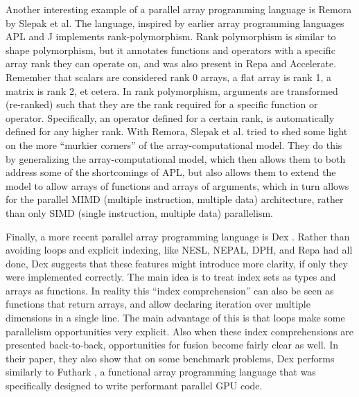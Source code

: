         Another interesting example of a parallel array programming language is Remora by Slepak et al. \cite{slepak2014array}
        The language, inspired by earlier array programming languages APL \cite{iverson1962programming} and J implements rank-polymorphism.
        Rank polymorphism is similar to shape polymorphism, but it annotates functions and operators with a specific array rank they can operate on, and was also present in Repa and Accelerate.
        Remember that scalars are considered rank 0 arrays, a flat array is rank 1, a matrix is rank 2, et cetera.
        In rank polymorphism, arguments are transformed (re-ranked) such that they are the rank required for a specific function or operator.
        Specifically, an operator defined for a certain rank, is automatically defined for any higher rank.
        With Remora, Slepak et al. tried to shed some light on the more ``murkier corners'' of the array-computational model.
        They do this by generalizing the array-computational model, which then allows them to both address some of the shortcomings of APL, but also allows them to extend the model to allow arrays of functions and arrays of arguments, which in turn allows for the parallel MIMD (multiple instruction, multiple data) architecture, rather than only SIMD (single instruction, multiple data) parallelism.

        Finally, a more recent parallel array programming language is Dex \cite{maclaurin2019dex,paszke2021getting}.
        Rather than avoiding loops and explicit indexing, like NESL, NEPAL, DPH, and Repa had all done, Dex suggests that these features might introduce more clarity, if only they were implemented correctly.
        The main idea is to treat index sets as types and arrays as functions.
        In reality this ``index comprehension'' can also be seen as functions that return arrays, and allow declaring iteration over multiple dimensions in a single line.
        The main advantage of this is that loops make some parallelism opportunities very explicit.
        Also when these index comprehensions are presented back-to-back, opportunities for fusion become fairly clear as well.
        In their paper, they also show that on some benchmark problems, Dex performs similarly to Futhark \cite{henriksen2017futhark}, a functional array programming language that was specifically designed to write performant parallel GPU code.
